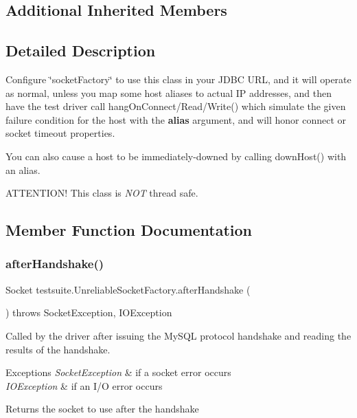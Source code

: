 \subsection*{Additional Inherited Members}


\subsection{Detailed Description}
Configure \char`\"{}socket\+Factory\char`\"{} to use this class in your J\+D\+BC U\+RL, and it will operate as normal, unless you map some host aliases to actual IP addresses, and then have the test driver call hang\+On\+Connect/\+Read/\+Write() which simulate the given failure condition for the host with the {\bfseries alias} argument, and will honor connect or socket timeout properties.

You can also cause a host to be immediately-\/downed by calling down\+Host() with an alias.

A\+T\+T\+E\+N\+T\+I\+O\+N! This class is {\itshape N\+OT} thread safe. 

\subsection{Member Function Documentation}
\mbox{\label{classtestsuite_1_1_unreliable_socket_factory_ab50d6b1a289f6f7205ab9ee2a2492673}} 
\subsubsection{\texorpdfstring{after\+Handshake()}{afterHandshake()}}
{\footnotesize\ttfamily Socket testsuite.\+Unreliable\+Socket\+Factory.\+after\+Handshake (\begin{DoxyParamCaption}{ }\end{DoxyParamCaption}) throws Socket\+Exception, I\+O\+Exception}

Called by the driver after issuing the My\+S\+QL protocol handshake and reading the results of the handshake.


\begin{DoxyExceptions}{Exceptions}
{\em Socket\+Exception} & if a socket error occurs \\
\hline
{\em I\+O\+Exception} & if an I/O error occurs\\
\hline
\end{DoxyExceptions}
\begin{DoxyReturn}{Returns}
the socket to use after the handshake 
\end{DoxyReturn}


